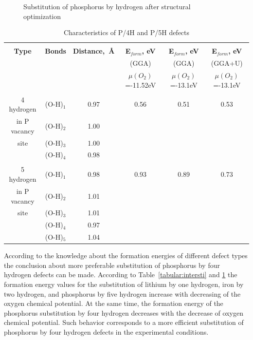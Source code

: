 \begin{figure}[h!]
\begin{minipage}[h]{0.49\linewidth}
\end{minipage}
\caption{Substitution of phosphorus by hydrogen after structural optimization}
\label{ris:P45H}
\end{figure}

\begin{table}[h!]
\caption{Characteristics of P/4H and P/5H defects}
\label{tabular:4or5H}
\begin{center}
\begin{tabular}{|c|c|c|c|c|c|}
\hline
& & & & &\\
\textbf{Type} & \textbf{Bonds} & \textbf{Distance,{~\AA}} & \textbf{E$_{form}$, eV} & \textbf{E$_{form}$, eV} & \textbf{E$_{form}$, eV} \\
& & & (GGA) & (GGA) & (GGA+U) \\
& & & $\mu (O_2)$=-11.52eV & $\mu (O_2)$=-13.1eV & $\mu (O_2)$=-13.1eV \\
\hline
& & & & &\\
4 hydrogen & (O-H)$_{1}$ &  0.97 & 0.56 & 0.51 & 0.53 \\ 
in P vacancy & (O-H)$_{2}$ & 1.00 & & &\\
site  & (O-H)$_{3}$ & 1.00 & & &\\
& (O-H)$_{4}$ & 0.98 & & &\\
\hline
& & & & &\\
5 hydrogen & (O-H)$_{1}$ &  0.98 &  0.93 & 0.89 & 0.73\\ 
in P vacancy & (O-H)$_{2}$ & 1.01 & & & \\
site  & (O-H)$_{3}$ & 1.01 & & & \\
& (O-H)$_{4}$ & 0.97 & & & \\
& (O-H)$_{5}$ & 1.04 & & & \\
\hline
\end{tabular}
\end{center}
\end{table}

According to the knowledge about the formation energies of different defect types the conclusion about more preferable substitution of phosphorus by four hydrogen defects can be made. According to Table~\ref{tabular:intersti} and \ref{tabular:4or5H} the formation energy values for the substitution of lithium by one hydrogen, iron by two hydrogen, and phosphorus by five hydrogen increase with decreasing of the oxygen chemical potential. At the same time, the formation energy of the phosphorus substitution by four hydrogen decreases with the decrease of oxygen chemical potential. Such behavior corresponds to a more efficient substitution of phosphorus by four hydrogen defects in the experimental conditions.


